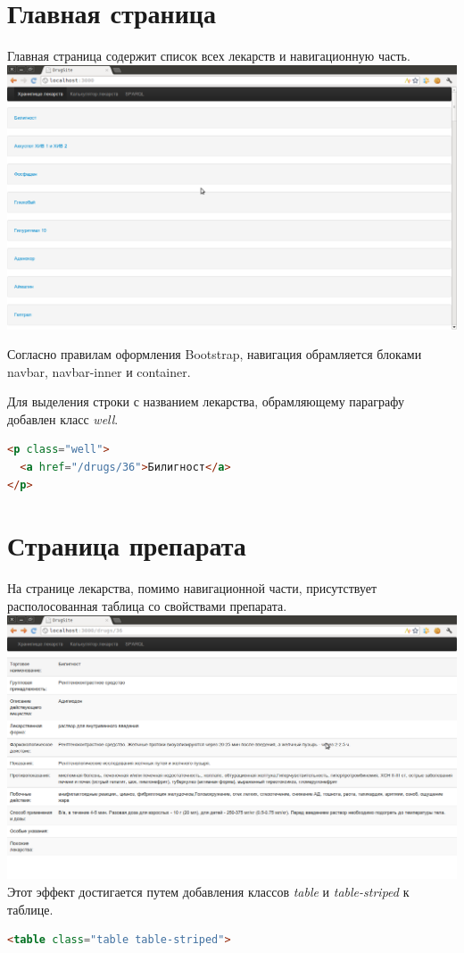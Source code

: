 \documentclass[specialist,subf,href,colorlinks=true
]{disser}
\begin{document}
\section{Главная страница}
Главная страница содержит список всех лекарств и навигационную часть. 
\\ \includegraphics[width=160mm]{4.png}

Согласно правилам оформления Bootstrap, навигация обрамляется блоками navbar, navbar-inner и container.


Для выделения строки с названием лекарства, обрамляющему параграфу добавлен класс \textit{well}.
\begin{lstlisting}[language=HTML]
<p class="well">
  <a href="/drugs/36">Билигност</a>
</p>
\end{lstlisting}

\section{Страница препарата}
На странице лекарства, помимо навигационной части, присутствует располосованная таблица со свойствами препарата.
\\ \includegraphics[width=160mm]{5.png}
\\ Этот эффект достигается путем добавления классов \textit{table} и \textit{table-striped} к таблице.
\begin{lstlisting}[language=HTML]
 <table class="table table-striped">
\end{lstlisting}
\end{document}
